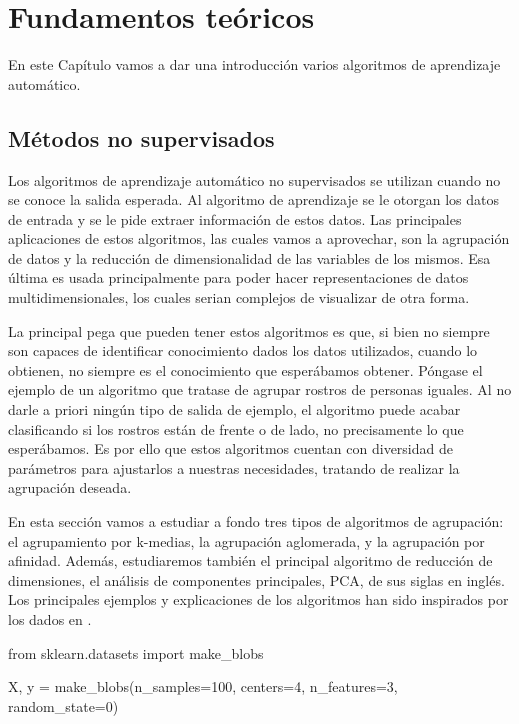 \chapter{Fundamentos teóricos} \label{chap:fundamentos-teoricos}

En este Capítulo vamos a dar una introducción varios algoritmos de aprendizaje automático.

\section{Métodos no supervisados}
\label{sec:unsupervised}

Los algoritmos de aprendizaje automático no supervisados se utilizan cuando no se conoce la salida esperada. Al algoritmo de aprendizaje se le otorgan los datos de entrada y se le pide extraer información de estos datos. Las principales aplicaciones de estos algoritmos, las cuales vamos a aprovechar, son la agrupación de datos y la reducción de dimensionalidad de las variables de los mismos. Esa última es usada principalmente para poder hacer representaciones de datos multidimensionales, los cuales serian complejos de visualizar de otra forma.

La principal pega que pueden tener estos algoritmos es que, si bien no siempre son capaces de identificar conocimiento dados los datos utilizados, cuando lo obtienen, no siempre es el conocimiento que esperábamos obtener. Póngase el ejemplo de un algoritmo que tratase de agrupar rostros de personas iguales. Al no darle a priori ningún tipo de salida de ejemplo, el algoritmo puede acabar clasificando si los rostros están de frente o de lado, no precisamente lo que esperábamos. Es por ello que estos algoritmos cuentan con diversidad de parámetros para ajustarlos a nuestras necesidades, tratando de realizar la agrupación deseada.

En esta sección vamos a estudiar a fondo tres tipos de algoritmos de agrupación: el agrupamiento por k-medias, la agrupación aglomerada, y la agrupación por afinidad. Además, estudiaremos también el principal algoritmo de reducción de dimensiones, el análisis de componentes principales, PCA, de sus siglas en inglés. Los principales ejemplos y explicaciones de los algoritmos han sido inspirados por los dados en \cite{machine}.

\begin{mypython}[float={h},caption={Generar datos artificiales de prueba.}]
  from sklearn.datasets import make_blobs

  X, y = make_blobs(n_samples=100, centers=4,
                  n_features=3, random_state=0)
\end{mypython}


